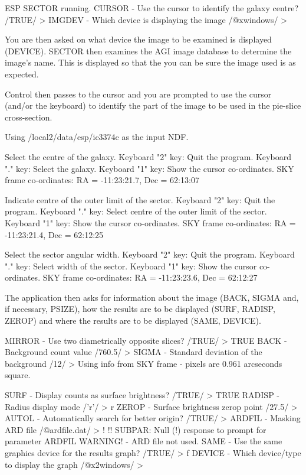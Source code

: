 \documentclass[twoside,11pt]{starlink}
\begin{document}
\begin{terminalv}

ESP SECTOR running.
CURSOR - Use the cursor to identify the galaxy centre? /TRUE/ >
IMGDEV - Which device is displaying the image /@xwindows/ >
\end{terminalv}

You are then asked
on what device the image to be examined is displayed (DEVICE).
SECTOR then examines the AGI image database to determine the image's name.
This is displayed so that the you can be sure the image used is as expected.

Control then passes to the cursor and you are prompted to use the
cursor (and/or the keyboard) to identify the part of the image to be used in
the pie-slice cross-section.

\begin{terminalv}
Using /local2/data/esp/ic3374c as the input NDF.

Select the centre of the galaxy.
Keyboard "2" key:   Quit the program.
Keyboard "." key:   Select the galaxy.
Keyboard "1" key:   Show the cursor co-ordinates.
  SKY frame co-ordinates:  RA = -11:23:21.7,  Dec = 62:13:07

Indicate centre of the outer limit of the sector.
Keyboard "2" key:   Quit the program.
Keyboard "." key:   Select centre of the outer  limit of the sector.
Keyboard "1" key:   Show the cursor co-ordinates.
  SKY frame co-ordinates:  RA = -11:23:21.4,  Dec = 62:12:25

Select the sector angular width.
Keyboard "2" key:   Quit the program.
Keyboard "." key:   Select width of the sector.
Keyboard "1" key:   Show the cursor co-ordinates.
  SKY frame co-ordinates:  RA = -11:23:23.6,  Dec = 62:12:27
\end{terminalv}

The application then asks
for information about the image (BACK, SIGMA and, if necessary, PSIZE),
how the results are to be displayed (SURF, RADISP, ZEROP)
and where the results are to be displayed (SAME, DEVICE).

\begin{terminalv}
MIRROR - Use two diametrically opposite slices? /TRUE/ > TRUE
BACK - Background count value /760.5/ >
SIGMA - Standard deviation of the background /12/ >
Using info from SKY frame - pixels are  0.961 arcseconds square.

SURF - Display counts as surface brightness? /TRUE/ > TRUE
RADISP - Radius display mode /'r'/ > r
ZEROP - Surface brightness zerop point /27.5/ >
AUTOL - Automatically search for better origin? /TRUE/ >
ARDFIL - Masking ARD file /@ardfile.dat/ > !
!! SUBPAR: Null (!) response to prompt for parameter ARDFIL
WARNING! - ARD file not used.
SAME - Use the same graphics device for the results graph? /TRUE/ > f
DEVICE - Which device/type to display the graph /@x2windows/ >
\end{terminalv}
\end{document}
